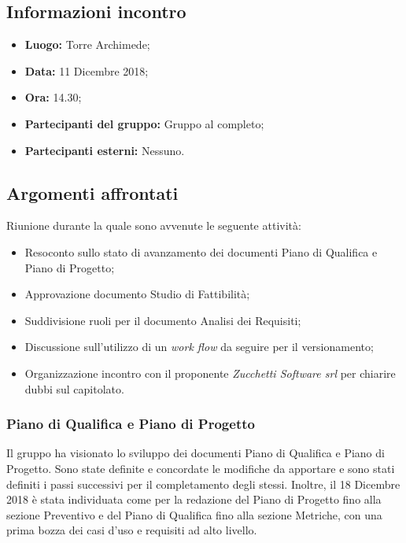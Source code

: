 \subsection{Informazioni incontro}
\begin{itemize}
	\item { \textbf{Luogo:} Torre Archimede;  }
	\item { \textbf{Data:} 11 Dicembre 2018; }
	\item { \textbf{Ora:} 14.30; }
	\item { \textbf{Partecipanti del gruppo:} Gruppo al completo; }
	\item { \textbf{Partecipanti esterni:} Nessuno. }
\end{itemize}


\subsection{Argomenti affrontati}
Riunione durante la quale sono avvenute le seguente attività:
\begin{itemize}
	\item{Resoconto sullo stato di avanzamento dei documenti Piano di Qualifica e Piano di Progetto;}
	\item{Approvazione documento Studio di Fattibilità;}
	\item{Suddivisione ruoli per il documento Analisi dei Requisiti;}
	\item{Discussione sull'utilizzo di un \emph{work flow} da seguire per il versionamento;}
	\item{Organizzazione incontro con il proponente \emph{Zucchetti Software srl} per chiarire dubbi sul capitolato. }
\end{itemize}

\subsubsection{Piano di Qualifica e Piano di Progetto}
Il gruppo ha visionato lo sviluppo dei documenti Piano di Qualifica e Piano di Progetto. Sono state definite e concordate le modifiche da apportare e sono stati definiti i passi successivi per il completamento degli stessi. Inoltre, il 18 Dicembre 2018 è stata individuata come  per la redazione del Piano di Progetto fino alla sezione Preventivo e del Piano di Qualifica fino alla sezione Metriche, con una prima bozza dei casi d'uso e requisiti ad alto livello.

